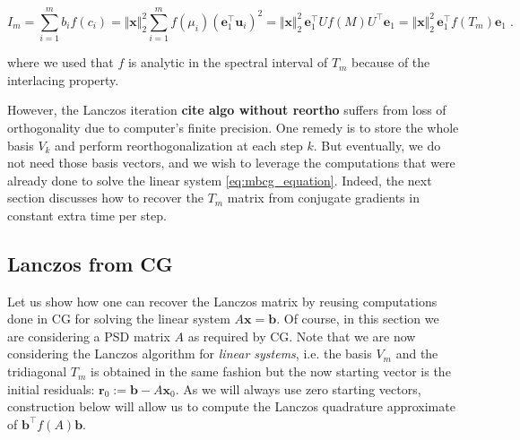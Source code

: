 \documentclass{article}
\newcommand{\vect}[1]{\boldsymbol{\mathbf{#1}}}
\newcommand{\norm}[1]{\Vert #1 \Vert}
\begin{document}
\begin{equation} \label{eq:lanczos_quadrature}
    I_m = \sum_{i=1}^m b_i f(c_i) = \norm{\vect x}_2^2 \sum_{i=1}^m f(\mu_i) (\vect e_1^\top \vect u_i)^2 
    = \norm{\vect x}_2^2 \, \vect e_1^\top U f(M) U^\top \vect e_1 = \norm{\vect x}_2^2 \,  \vect e_1^\top f(T_m) \vect e_1 \;.
\end{equation}


where we used that $f$ is analytic in the spectral interval of $T_m$ because of the interlacing property. 
%

However, the Lanczos iteration \textbf{cite algo without reortho} suffers from loss of orthogonality due to computer's finite precision. One remedy is to store the whole basis $V_k$ and perform reorthogonalization at each step $k$. But eventually, we do not need those basis vectors, and we wish to leverage the computations that were already done to solve the linear system \eqref{eq:mbcg_equation}. Indeed, the next section discusses how to recover the $T_m$ matrix from conjugate gradients in constant extra time per step. 



\subsection{Lanczos from CG} \label{sec:lanczos_from_cg}

Let us show how one can recover the Lanczos matrix by reusing computations done in CG for solving the linear system $A \vect x = \vect b$. Of course, in this section we are considering a PSD matrix $A$ as required by CG. Note that we are now considering the Lanczos algorithm for \emph{linear systems}, i.e. the basis $V_m$ and the tridiagonal $T_m$ is obtained in the same fashion but the now starting vector is the initial residuals: $\vect r_0 := \vect b - A \vect x_0$. 
As we will always use zero starting vectors, construction below will allow us to compute the Lanczos quadrature approximate of $\vect b^\top f(A) \vect b$.
\end{document}
